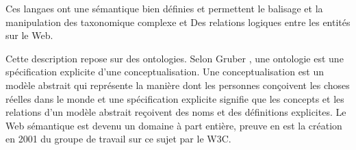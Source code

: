 Ces langaes ont une sémantique bien définies et permettent le balisage
et la manipulation des taxonomique complexe et Des relations logiques
entre les entités sur le Web. \cite{fensel2000creating}

% 

Cette description repose sur des ontologies. Selon Gruber
\cite{gruber1993translation}, une ontologie est une spécification
explicite d'une conceptualisation. Une conceptualisation est un modèle
abstrait qui représente la manière dont les personnes conçoivent les
choses réelles dans le monde et une spécification explicite signifie
que les concepts et les relations d'un modèle abstrait reçoivent des
noms et des définitions explicites. Le Web sémantique est devenu un
domaine à part entière, preuve en est la création en 2001 du groupe de
travail sur ce sujet par le \textsc{W3C}.

